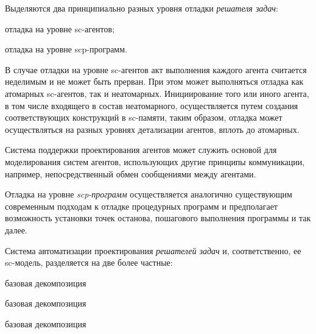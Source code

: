 Выделяются два принципиально разных уровня отладки \textit{решателя задач}:
\begin{textitemize}
    \item отладка на уровне sc-агентов;
    \item отладка на уровне scp-программ.
\end{textitemize}

В случае отладки на уровне sc-агентов акт выполнения каждого агента считается неделимым и не может быть прерван. При этом может выполняться отладка как атомарных sc-агентов, так и неатомарных. Инициирование того или иного агента, в том числе входящего в состав неатомарного, осуществляется путем создания соответствующих конструкций в sc-памяти, таким образом, отладка может осуществляться на разных уровнях детализации агентов, вплоть до атомарных.

Система поддержки проектирования агентов может служить основой для моделирования систем агентов, использующих другие принципы коммуникации, например, непосредственный обмен сообщениями между агентами.

Отладка на уровне \textit{scp-программ} осуществляется аналогично существующим современным подходам к отладке процедурных программ и предполагает возможность установки точек останова, пошагового выполнения программы и так далее.

Система автоматизации проектирования \textit{решателей задач} и, соответственно, ее sc-модель, разделяется на две более частные:

\begin{SCn}
\begin{scnrelfromset}{базовая декомпозиция}
\begin{scnindent}
    \begin{scnrelfromset}{базовая декомпозиция}
    \end{scnrelfromset}
\end{scnindent}
\begin{scnindent}
    \begin{scnrelfromset}{базовая декомпозиция}
    \end{scnrelfromset}
\end{scnindent}
\end{scnrelfromset}
\end{SCn}

